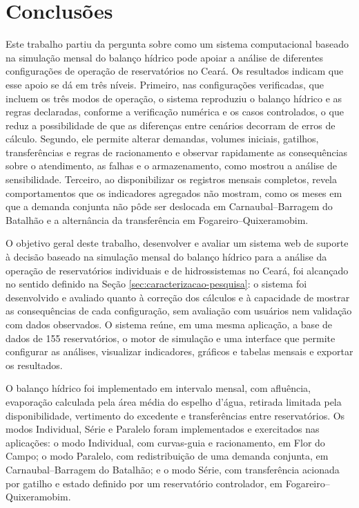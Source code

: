 \chapter{Conclusões}
\label{chap:conclusoes}

Este trabalho partiu da pergunta sobre como um sistema computacional baseado na simulação mensal do balanço hídrico pode apoiar a análise de diferentes configurações de operação de reservatórios no Ceará. Os resultados indicam que esse apoio se dá em três níveis. Primeiro, nas configurações verificadas, que incluem os três modos de operação, o sistema reproduziu o balanço hídrico e as regras declaradas, conforme a verificação numérica e os casos controlados, o que reduz a possibilidade de que as diferenças entre cenários decorram de erros de cálculo. Segundo, ele permite alterar demandas, volumes iniciais, gatilhos, transferências e regras de racionamento e observar rapidamente as consequências sobre o atendimento, as falhas e o armazenamento, como mostrou a análise de sensibilidade. Terceiro, ao disponibilizar os registros mensais completos, revela comportamentos que os indicadores agregados não mostram, como os meses em que a demanda conjunta não pôde ser deslocada em Carnaubal--Barragem do Batalhão e a alternância da transferência em Fogareiro--Quixeramobim.

O objetivo geral deste trabalho, desenvolver e avaliar um sistema web de suporte à decisão baseado na simulação mensal do balanço hídrico para a análise da operação de reservatórios individuais e de hidrossistemas no Ceará, foi alcançado no sentido definido na Seção \ref{sec:caracterizacao-pesquisa}: o sistema foi desenvolvido e avaliado quanto à correção dos cálculos e à capacidade de mostrar as consequências de cada configuração, sem avaliação com usuários nem validação com dados observados. O sistema reúne, em uma mesma aplicação, a base de dados de 155 reservatórios, o motor de simulação e uma interface que permite configurar as análises, visualizar indicadores, gráficos e tabelas mensais e exportar os resultados.

O balanço hídrico foi implementado em intervalo mensal, com afluência, evaporação calculada pela área média do espelho d'água, retirada limitada pela disponibilidade, vertimento do excedente e transferências entre reservatórios. Os modos Individual, Série e Paralelo foram implementados e exercitados nas aplicações: o modo Individual, com curvas-guia e racionamento, em Flor do Campo; o modo Paralelo, com redistribuição de uma demanda conjunta, em Carnaubal--Barragem do Batalhão; e o modo Série, com transferência acionada por gatilho e estado definido por um reservatório controlador, em Fogareiro--Quixeramobim.

